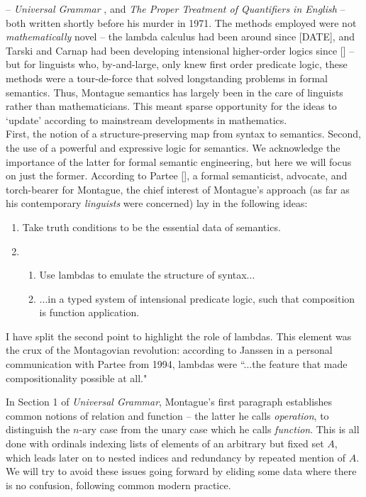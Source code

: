  -- \emph{Universal Grammar} \cite{montague1970universal}, and \emph{The Proper Treatment of Quantifiers in English} \cite{montague1973proper} -- both written shortly before his murder in 1971. The methods employed were not \emph{mathematically} novel -- the lambda calculus had been around since [DATE], and Tarski and Carnap had been developing intensional higher-order logics since [] -- but for linguists who, by-and-large, only knew first order predicate logic, these methods were a tour-de-force that solved longstanding problems in formal semantics. Thus, Montague semantics has largely been in the care of linguists rather than mathematicians. This meant sparse opportunity for the ideas to `update' according to mainstream developments in mathematics.\\

 First, the notion of a structure-preserving map from syntax to semantics. Second, the use of a powerful and expressive logic for semantics. We acknowledge the importance of the latter for formal semantic engineering, but here we will focus on just the former. According to Partee [], a formal semanticist, advocate, and torch-bearer for Montague, the chief interest of Montague's approach (as far as his contemporary \emph{linguists} were concerned) lay in the following ideas:

\begin{enumerate}
\item{Take truth conditions to be the essential data of semantics.}
\item{
\begin{enumerate}
\item{Use lambdas to emulate the structure of syntax...}
\item{...in a typed system of intensional predicate logic, such that composition is function application.}
\end{enumerate}}
\end{enumerate}

I have split the second point to highlight the role of lambdas. This element was the crux of the Montagovian revolution: according to Janssen in a personal communication with Partee from 1994, lambdas were ``...the feature that made compositionality possible at all."

In Section 1 of \emph{Universal Grammar}, Montague's first paragraph establishes common notions of relation and function -- the latter he calls \emph{operation}, to distinguish the $n$-ary case from the unary case which he calls \emph{function}. This is all done with ordinals indexing lists of elements of an arbitrary but fixed set $A$, which leads later on to nested indices and redundancy by repeated mention of $A$. We will try to avoid these issues going forward by eliding some data where there is no confusion, following common modern practice.\\

